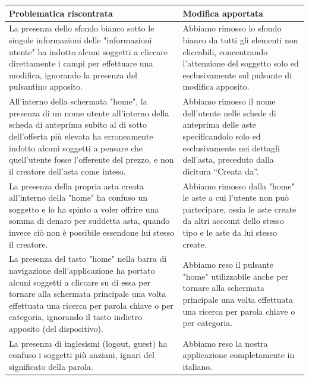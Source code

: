             \begin{center}
            \begin{tabular}{|C{7.35cm}|C{7.35cm}|}
                \hline
                    \textbf{Problematica riscontrata} & \textbf{Modifica apportata}\\
                \hline
                    La presenza dello sfondo bianco sotto le singole informazioni delle "informazioni utente" ha indotto alcuni soggetti a cliccare direttamente i campi per effettuare una modifica, ignorando la presenza del pulsantino apposito. &
                    Abbiamo rimosso lo sfondo bianco da tutti gli elementi non cliccabili, concentrando l’attenzione del soggetto solo ed esclusivamente sul pulsante di modifica apposito. \\
                \hline
                    All'interno della schermata "home", la presenza di un nome utente all’interno della scheda di anteprima subito al di sotto dell’offerta più elevata ha erroneamente indotto alcuni soggetti a pensare che quell’utente fosse l’offerente del prezzo, e non il creatore dell’asta come inteso. &
                    Abbiamo rimosso il nome dell’utente nelle schede di anteprima delle aste specificandolo solo ed esclusivamente nei dettagli dell’asta, preceduto dalla dicitura “Creata da”. \\
                \hline
                    La presenza della propria asta creata all’interno della "home" ha confuso un soggetto e lo ha spinto a voler offrire una somma di denaro per suddetta asta, quando invece ciò non è possibile essendone lui stesso il creatore. &
                    Abbiamo rimosso dalla "home" le aste a cui l’utente non può partecipare, ossia le aste create da altri account dello stesso tipo e le aste da lui stesso create. \\
                \hline
                    La presenza del tasto "home" nella barra di navigazione dell’applicazione ha portato alcuni soggetti a cliccare su di essa per tornare alla schermata principale una volta effettuata una ricerca per parola chiave o per categoria, ignorando il tasto indietro apposito (del dispositivo). &
                    Abbiamo reso il pulsante "home" utilizzabile anche per tornare alla schermata principale una volta effettuata una ricerca per parola chiave o per categoria.\\
                \hline
                    La presenza di inglesismi (logout, guest) ha confuso i soggetti più anziani, ignari del significato della parola. &
                    Abbiamo reso la nostra applicazione completamente in italiano.\\

\end{tabular}
\end{center}
